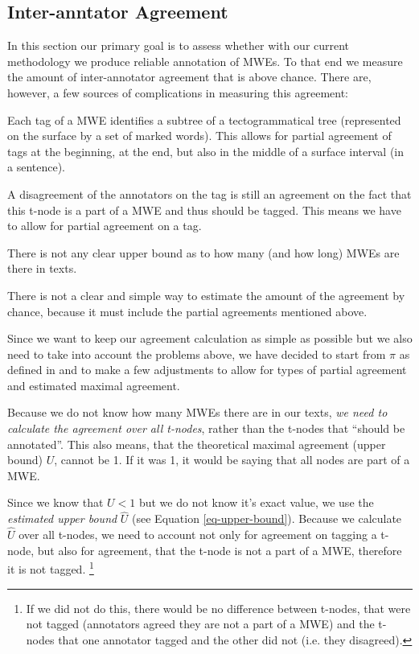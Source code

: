 \documentclass[11pt]{article}
\begin{document}
\subsection{Inter-anntator Agreement}
\label{agreement}

In this section our primary goal is to assess whether with our current methodology we produce reliable annotation of MWEs. To that end we measure the amount of inter-annotator agreement that is above chance. There are, however, a few sources of complications in measuring this agreement:
\begin{asparaitem}
	\item 
	Each tag of a MWE identifies a subtree of a tectogrammatical tree (represented on the surface by a set of marked words). This allows for partial agreement of tags at the beginning, at the end, but also in the middle of a surface interval (in a sentence).
	\item
	A disagreement of the annotators on the tag is still an agreement on the fact that this t-node is a part of a MWE and thus should be tagged. This means we have to allow for partial agreement on a tag.
	\item
	There is not any clear upper bound as to how many (and how long) MWEs are there in texts. 
	\item 
	There is not a clear and simple way to estimate the amount of the agreement by chance, because it must include the partial agreements mentioned above.
\end{asparaitem}

Since we want to keep our agreement calculation as simple as possible but we also need to take into account the problems above, we have decided to start from $\pi$ as defined in \cite{artstein:2007} and to make a few adjustments to allow for types of partial agreement and estimated maximal agreement.


Because we do not know how many MWEs there are in our texts, \textit{we need to calculate the agreement over all t-nodes}, rather than the t-nodes that ``should be annotated''. This also means, that the theoretical maximal agreement (upper bound) $U$, cannot be 1. If it was 1, it would be saying that all nodes are part of a MWE. 

Since we know that $U < 1$ but we do not know it's exact value, we use the \textit{estimated upper bound} $\widehat{U}$ (see Equation \ref{eq-upper-bound}). Because we calculate $\widehat{U}$ over all t-nodes, we need to account not only for agreement on tagging a t-node, but also for agreement, that the t-node is not a part of a MWE, therefore it is not tagged.%
\footnote{If we did not do this, there would be no difference between t-nodes, that were not tagged (annotators agreed they are not a part of a MWE) and the t-nodes that one annotator tagged and the other did not (i.e. they disagreed).}
%
\end{document}
